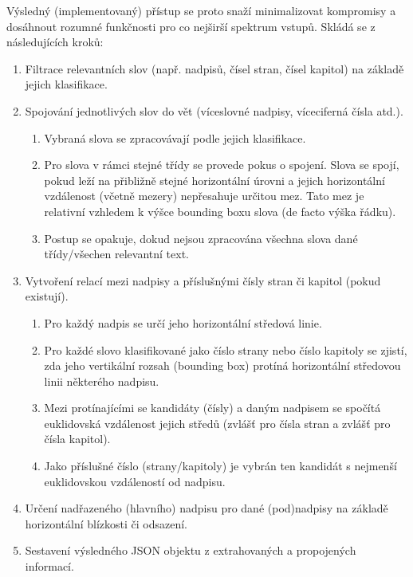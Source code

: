 \documentclass{article}
\begin{document}
Výsledný (implementovaný) přístup se proto snaží minimalizovat kompromisy a dosáhnout rozumné funkčnosti pro co nejširší spektrum vstupů. Skládá se z následujících kroků:
\begin{enumerate}
    \item Filtrace relevantních slov (např. nadpisů, čísel stran, čísel kapitol) na základě jejich klasifikace.
    \item Spojování jednotlivých slov do vět (víceslovné nadpisy, víceciferná čísla atd.).
        \begin{enumerate}
            \item Vybraná slova se zpracovávají podle jejich klasifikace.
            \item Pro slova v rámci stejné třídy se provede pokus o spojení. Slova se spojí, pokud leží na přibližně stejné horizontální úrovni a jejich horizontální vzdálenost (včetně mezery) nepřesahuje určitou mez. Tato mez je relativní vzhledem k výšce bounding boxu slova (de facto výška řádku).
            \item Postup se opakuje, dokud nejsou zpracována všechna slova dané třídy/všechen relevantní text.
        \end{enumerate}
    \item Vytvoření relací mezi nadpisy a příslušnými čísly stran či kapitol (pokud existují).
        \begin{enumerate}
                \item Pro každý nadpis se určí jeho horizontální středová linie.
                \item Pro každé slovo klasifikované jako číslo strany nebo číslo kapitoly se zjistí, zda jeho vertikální rozsah (bounding box) protíná horizontální středovou linii některého nadpisu.
                \item Mezi protínajícími se kandidáty (čísly) a daným nadpisem se spočítá euklidovská vzdálenost jejich středů (zvlášť pro čísla stran a zvlášť pro čísla kapitol).
                \item Jako příslušné číslo (strany/kapitoly) je vybrán ten kandidát s nejmenší euklidovskou vzdáleností od nadpisu.
        \end{enumerate}
    \item Určení nadřazeného (hlavního) nadpisu pro dané (pod)nadpisy na základě horizontální blízkosti či odsazení.
    \item Sestavení výsledného JSON objektu z extrahovaných a propojených informací.
\end{enumerate}
\end{document}
